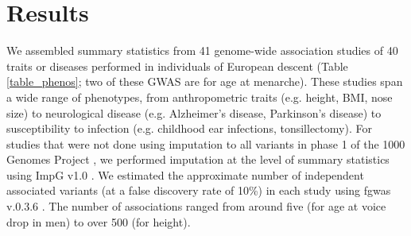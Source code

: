 \documentclass[11pt,titlepage]{article}
\begin{document}
\section{Results}
We assembled summary statistics from 41 genome-wide association studies of 40 traits or diseases performed in individuals of European descent (Table \ref{table_phenos}; two of these GWAS are for age at menarche). 
These studies span a wide range of phenotypes, from anthropometric traits (e.g. height, BMI, nose size) to neurological disease (e.g. Alzheimer's disease, Parkinson's disease) to susceptibility to infection (e.g. childhood ear infections, tonsillectomy).
For studies that were not done using imputation to all variants in phase 1 of the 1000 Genomes Project \citep{abecasis2010map}, we performed imputation at the level of summary statistics using ImpG v1.0 \citep{Pasaniuc:2014aa}. 
We estimated the approximate number of independent associated variants (at a false discovery rate of 10\%) in each study using fgwas v.0.3.6 \citep{pickrell2013joint}. 
The number of associations ranged from around five (for age at voice drop in men) to over 500 (for height). 
\end{document}

